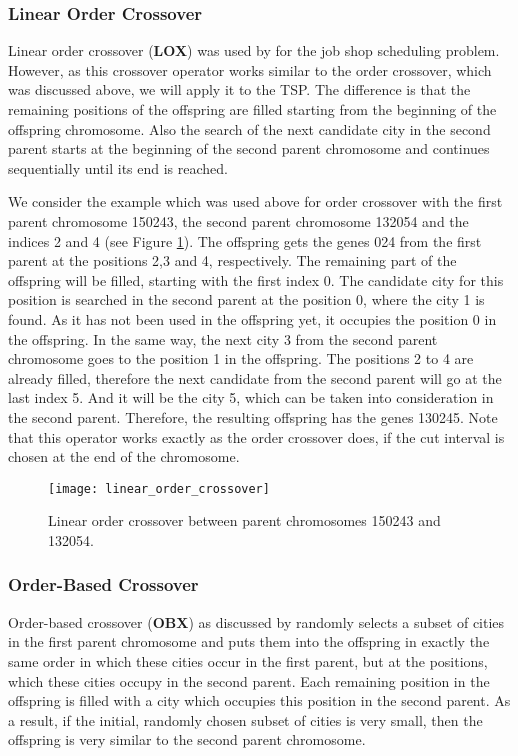\subsubsection{Linear Order Crossover}
\label{subsubsec:linear_order}

Linear order crossover (\textbf{LOX}) was used by \citeauthor{akay2013recent} \cite{akay2013recent} for the job shop scheduling problem. However, as this crossover operator works similar to the order crossover, which was discussed above, we will apply it to the TSP. The difference is that the remaining positions of the offspring are filled starting from the beginning of the offspring chromosome. Also the search of the next candidate city in the second parent  starts at the beginning of the second parent chromosome and continues sequentially until its end is reached.\par

We consider the example which was used above for order crossover with the first parent chromosome 150243, the second parent chromosome 132054 and the indices 2 and 4 (see Figure \ref{linear_order_crossover}). The offspring gets the genes 024 from the first parent at the positions 2,3 and 4, respectively. The remaining part of the offspring will be filled, starting with the first index 0. The candidate city for this position is searched in the second parent at the position 0, where the city 1 is found. As it has not been used in the offspring yet, it occupies the position 0 in the offspring. In the same way, the next city 3 from the second parent chromosome goes to the position 1 in the offspring. The positions 2 to 4 are already filled, therefore the next candidate from the second parent will go at the last index 5. And it will be the city 5, which can be taken into consideration in the second parent. Therefore, the resulting offspring has the genes 130245.
Note that this operator works exactly as the order crossover does, if the cut interval is chosen at the end of the chromosome.

\begin{figure}[htp] \centering
	\centering
	\texttt{[image: linear\_order\_crossover]}
	\caption{Linear order crossover between parent chromosomes 150243 and 132054.}
	\label{linear_order_crossover}
\end{figure}

\subsubsection{Order-Based Crossover}
\label{subsubsec:order_based}
Order-based crossover (\textbf{OBX}) as discussed by \citeauthor{potvin1996genetic} \cite{potvin1996genetic} randomly selects a subset of cities in the first parent chromosome and puts them into the offspring in exactly the same order in which these cities occur in the first parent, but at the positions, which these cities occupy in the second parent. Each remaining position in the offspring is filled with a city which occupies this position in the second parent. As a result, if the initial, randomly chosen subset of cities is very small, then the offspring is very similar to the second parent chromosome.\par

